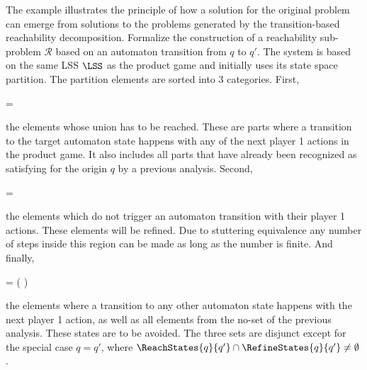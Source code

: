     The example illustrates the principle of how a solution for the original problem can emerge from solutions to the problems generated by the transition-based reachability decomposition.
    Formalize the construction of a reachability sub-problem $\mathcal{R}$ based on an automaton transition from $q$ to $q'$.
    The system is based on the same LSS $\LSS$ as the product game and initially uses its state space partition.
    The partition elements are sorted into 3 categories.
    First,

    \startformula
         =  \EndComma
    \stopformula

    the elements whose union has to be reached.
    These are parts where a transition to the target automaton state happens with any of the next player 1 actions in the product game.
    It also includes all parts that have already been recognized as satisfying for the origin $q$ by a previous analysis.
    Second,

    \startformula
         =  \EndComma
    \stopformula

    the elements which do not trigger an automaton transition with their player 1 actions.
    These elements will be refined.
    Due to stuttering equivalence any number of steps inside this region can be made as long as the number is finite.
    And finally,

    \startformula
         =  \setminus \left(  \cup {} \right) \EndComma
    \stopformula

    the elements where a transition to any other automaton state happens with the next player 1 action, as well as all elements from the no-set of the previous analysis.
    These states are to be avoided.
    The three sets are disjunct except for the special case $q = q'$, where $\ReachStates{q}{q'} \cap \RefineStates{q}{q'} \ne \emptyset$.

\stopsubsection


